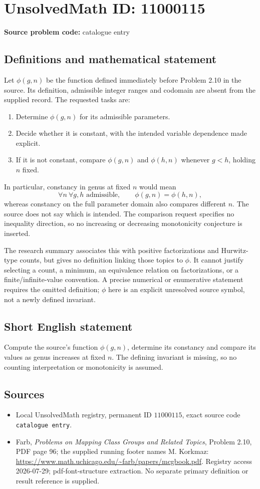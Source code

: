 \documentclass[11pt]{article}
\begin{document}
\section*{UnsolvedMath ID: 11000115}
\textbf{Source problem code:} catalogue entry
\subsection{Definitions and mathematical statement}
Let \(\phi(g,n)\) be the function defined immediately before Problem 2.10 in the source. Its definition, admissible integer ranges and codomain are absent from the supplied record. The requested tasks are:
\begin{enumerate}
\item Determine \(\phi(g,n)\) for its admissible parameters.
\item Decide whether it is constant, with the intended variable dependence made explicit.
\item If it is not constant, compare \(\phi(g,n)\) and \(\phi(h,n)\) whenever \(g<h\), holding \(n\) fixed.
\end{enumerate}
In particular, constancy in genus at fixed \(n\) would mean
\[\forall n\ \forall g,h\text{ admissible},\qquad \phi(g,n)=\phi(h,n),\]
whereas constancy on the full parameter domain also compares different \(n\). The source does not say which is intended. The comparison request specifies no inequality direction, so no increasing or decreasing monotonicity conjecture is inserted.

The research summary associates this with positive factorizations and Hurwitz-type counts, but gives no definition linking those topics to \(\phi\). It cannot justify selecting a count, a minimum, an equivalence relation on factorizations, or a finite/infinite-value convention. A precise numerical or enumerative statement requires the omitted definition; \(\phi\) here is an explicit unresolved source symbol, not a newly defined invariant.
\subsection{Short English statement}
Compute the source's function \(\phi(g,n)\), determine its constancy and compare its values as genus increases at fixed \(n\). The defining invariant is missing, so no counting interpretation or monotonicity is assumed.
\subsection{Sources}
\begin{itemize}
\item Local UnsolvedMath registry, permanent ID \(11000115\), exact source code \texttt{catalogue entry}.
\item Farb, \emph{Problems on Mapping Class Groups and Related Topics}, Problem 2.10, PDF page 96; the supplied running footer names M. Korkmaz: \url{https://www.math.uchicago.edu/~farb/papers/mcgbook.pdf}. Registry access 2026-07-29; pdf-font-structure extraction. No separate primary definition or result reference is supplied.
\end{itemize}
\end{document}
